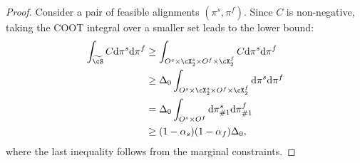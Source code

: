 \begin{proof}
Consider a pair of feasible alignments $(\pi^s, \pi^f)$. Since $C$ is non-negative, taking the COOT integral over a smaller set leads to the lower bound:
\begin{equation*}
    \begin{split}
        \int_{\widetilde{\cS}} C \mathrm d\pi^s\mathrm d\pi^f
        &\geq \int_{O^s \times \cX_2^s \times O^f \times \cX_2^f} C \mathrm d\pi^s\mathrm d\pi^f \\
          &\geq  \Delta_0 \int_{O^s \times \cX_2^s \times O^f \times \cX_2^f}  \mathrm d\pi^s\mathrm d\pi^f \\
          &= \Delta_0 \int_{O^s\times O^f}  \mathrm d\pi^s_{\#1} \mathrm d\pi^f_{\#1} \\
          &\geq (1 - \alpha_s)(1 -\alpha_f)\Delta_0,
    \end{split}
\end{equation*}
where the last inequality follows from the marginal constraints.
\end{proof}

